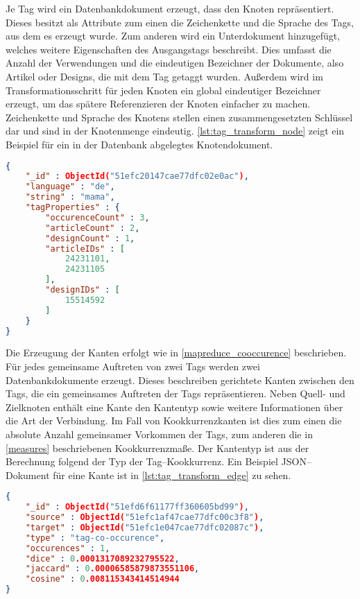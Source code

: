 Je Tag wird ein Datenbankdokument erzeugt, dass den Knoten repräsentiert. Dieses besitzt als Attribute zum einen die Zeichenkette und die Sprache des Tags, aus dem es erzeugt wurde. Zum anderen wird ein Unterdokument hinzugefügt, welches weitere Eigenschaften des Ausgangstags beschreibt. Dies umfasst die Anzahl der Verwendungen und die eindeutigen Bezeichner der Dokumente, also Artikel oder Designs, die mit dem Tag getaggt wurden. Außerdem wird im Transformationsschritt für jeden Knoten ein global eindeutiger Bezeichner erzeugt, um das spätere Referenzieren der Knoten einfacher zu machen. Zeichenkette und Sprache des Knotens stellen einen zusammengesetzten Schlüssel dar und sind in der Knotenmenge eindeutig. \cref{lst:tag_transform_node} zeigt ein Beispiel für ein in der Datenbank abgelegtes Knotendokument.

\begin{lstlisting}[language=json, label={lst:tag_transform_node}, caption={Tag--Knoten als JSON--Dokument}]
{
    "_id" : ObjectId("51efc20147cae77dfc02e0ac"),
    "language" : "de",
    "string" : "mama",
    "tagProperties" : {
        "occurenceCount" : 3,
        "articleCount" : 2,
        "designCount" : 1,
        "articleIDs" : [
            24231101,
            24231105
        ],
        "designIDs" : [
            15514592
        ]
    }
}
\end{lstlisting}

Die Erzeugung der Kanten erfolgt wie in \cref{mapreduce_cooccurence} beschrieben. Für  jedes gemeinsame Auftreten von zwei Tags werden zwei Datenbankdokumente erzeugt. Dieses beschreiben gerichtete Kanten zwischen den Tags, die ein gemeinsames Auftreten der Tags repräsentieren. Neben Quell- und Zielknoten enthält eine Kante den Kantentyp sowie weitere Informationen über die Art der Verbindung. Im Fall von Kookkurrenzkanten ist dies zum einen die absolute Anzahl gemeinsamer Vorkommen der Tags, zum anderen die in \cref{measures} beschriebenen Kookkurrenzmaße. Der Kantentyp ist aus der Berechnung folgend der Typ der Tag--Kookkurrenz. Ein Beispiel JSON--Dokument für eine Kante ist in \cref{lst:tag_transform_edge} zu sehen.

\begin{lstlisting}[language=json, label={lst:tag_transform_edge}, caption={Tag--Kante als JSON--Dokument}]
{
    "_id" : ObjectId("51efd6f61177ff360605bd99"),
    "source" : ObjectId("51efc1af47cae77dfc00c3f8"),
    "target" : ObjectId("51efc1e047cae77dfc02087c"),
    "type" : "tag-co-occurence",
    "occurences" : 1,
    "dice" : 0.0001317089232795522,
    "jaccard" : 0.00006585879873551106,
    "cosine" : 0.008115343414514944
}
\end{lstlisting}

